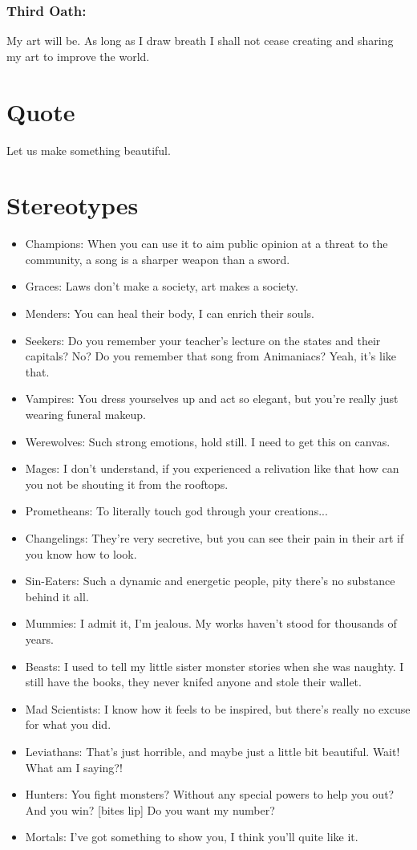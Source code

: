 \subsubsection*{Third Oath:} My art will be. As long as I draw breath I shall not cease creating and sharing my art to improve the world.
\section*{Quote}
Let us make something beautiful.

\section*{Stereotypes}
\begin{itemize}
\item Champions: When you can use it to aim public opinion at a threat to the community, a song is a sharper weapon than a sword.
\item Graces: Laws don't make a society, art makes a society.
\item Menders: You can heal their body, I can enrich their souls.
\item Seekers: Do you remember your teacher's lecture on the states and their capitals? No? Do you remember that song from Animaniacs? Yeah, it's like that.
 
\item Vampires: You dress yourselves up and act so elegant, but you're really just wearing funeral makeup.
\item Werewolves: Such strong emotions, hold still. I need to get this on canvas. 
\item Mages: I don't understand, if you experienced a relivation like that how can you not be shouting it from the rooftops. 
\item Prometheans: To literally touch god through your creations...
\item Changelings: They're very secretive, but you can see their pain in their art if you know how to look.
\item Sin-Eaters: Such a dynamic and energetic people, pity there's no substance behind it all.
\item Mummies: I admit it, I'm jealous. My works haven't stood for thousands of years. 
\item Beasts:  I used to tell my little sister monster stories when she was naughty. I still have the books, they never knifed anyone and stole their wallet.
\item Mad Scientists: I know how it feels to be inspired, but there's really no excuse for what you did.
\item Leviathans: That's just horrible, and maybe just a little bit beautiful. Wait! What am I saying?!

\item Hunters: You fight monsters? Without any special powers to help you out? And you win? [bites lip] Do you want my number?
\item Mortals: I've got something to show you, I think you'll quite like it. 
\end{itemize}

